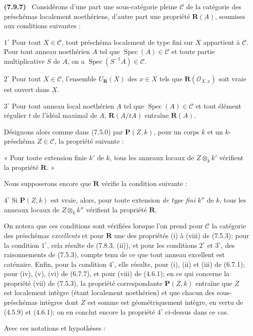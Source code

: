 \documentclass[10pt,oneside]{book}
\newcommand{\oldpage}[2][]{%
  \setcounter{footnote}{0}%
  \marginpar{\scriptsize\textbf{#1}~|~#2}\ignorespaces}
\newenvironment{env}[1][]{\par\medskip\noindent\textbf{(#1)}\ }{\par}
\begin{document}
\begin{env}[7.9.7]
\label{IV.2.s7.9.7-fr}
Considérons d'une part une sous-catégorie pleine $\mathcal C$ de la catégorie
des préschémas localement noethériens, d'autre part une propriété
$\boldsymbol R(A)$, soumises aux conditions suivantes :

$1^\circ$ Pour tout $X\in\mathcal C$, tout préschéma localement de type fini
sur $X$ appartient à $\mathcal C$. Pour tout anneau noethérien $A$ tel que
$\operatorname{Spec}(A)\in\mathcal C$ et toute partie multiplicative $S$ de
$A$, on a $\operatorname{Spec}(S^{-1}A)\in\mathcal C$.

$2^\circ$ Pour tout $X\in\mathcal C$, l'ensemble
$U_{\boldsymbol R}(X)$ des $x\in X$ tels que
$\boldsymbol R(\mathcal O_{X,x})$ soit vraie est ouvert dans $X$.

$3^\circ$ Pour tout anneau local noethérien $A$ tel que
$\operatorname{Spec}(A)\in\mathcal C$ et tout élément régulier $t$ de l'idéal
maximal de $A$, $\boldsymbol R(A/tA)$ entraîne $\boldsymbol R(A)$.

Désignons alors comme dans (7.5.0) par $\boldsymbol P(Z,k)$, pour un corps $k$
et un $k$-préschéma $Z\in\mathcal C$, la propriété suivante :

« Pour toute extension finie $k'$ de $k$, tous les anneaux locaux de
$Z\otimes_k k'$ vérifient la propriété $\boldsymbol R$. »

\oldpage[IV-2]{221}

Nous supposerons encore que $\boldsymbol R$ vérifie la condition suivante :

$4^\circ$ Si $\boldsymbol P(Z,k)$ est vraie, alors, pour toute extension
\emph{de type fini} $k''$ de $k$, tous les anneaux locaux de
$Z\otimes_k k''$ vérifient la propriété $\boldsymbol R$.

On notera que ces conditions sont vérifiées lorsque l'on prend pour
$\mathcal C$ la catégorie des préschémas \emph{excellents} et pour
$\boldsymbol R$ une des propriétés (i) à (viii) de (7.5.3); pour la condition
$1^\circ$, cela résulte de (7.8.3, (ii)), et pour les conditions $2^\circ$ et
$3^\circ$, des raisonnements de (7.5.3), compte tenu de ce que tout anneau
excellent est caténaire. Enfin, pour la condition $4^\circ$, elle résulte,
pour (i), (ii) et (iii) de (6.7.1); pour (iv), (v), (vi) de (6.7.7), et pour
(viii) de (4.6.1); en ce qui concerne la propriété (vii) de (7.5.3), la
propriété correspondante $\boldsymbol P(Z,k)$ entraîne que $Z$ est localement
intègre (étant localement noethérien) et que chacun des sous-préschémas
intègres dont $Z$ est somme est géométriquement intègre, en vertu de (4.5.9)
et (4.6.1); on en conclut encore la propriété $4^\circ$ ci-dessus dans ce cas.

Avec ces notations et hypothèses :
\end{env}
\end{document}
